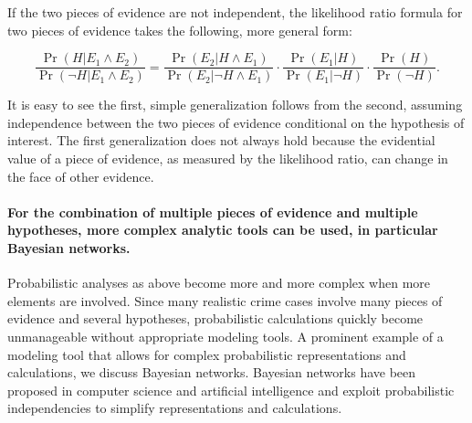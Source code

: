 \documentclass[10pt]{article}
\begin{document}
 If the two pieces of evidence are not independent, 
the likelihood ratio formula for two pieces of evidence 
takes the following, more general 
form:

	\[ \frac{\Pr(H|E_1 \land E_2)}{\Pr(\neg H | E_1 \land E_2)} = 
	\frac{\Pr(E_2 | H \land E_1)}{\Pr(E_2| \neg H \land E_1)}
	\cdot 
	\frac{\Pr(E_1 | H)}{\Pr(E_1| \neg H)}
	\cdot 
	\frac{\Pr(H)}{\Pr(\neg H)}.\]

\noindent It is easy to see the first, simple generalization follows from the second, assuming 
independence between the two pieces of evidence conditional on the hypothesis of interest. 
The first generalization does not always hold because 
the evidential value of a piece of evidence, as measured by the likelihood ratio, 
can change in the face of other evidence. 









\paragraph{For the combination of multiple pieces of evidence and multiple hypotheses, more complex analytic tools can be used, in particular Bayesian networks.} Probabilistic analyses as above become more and more complex when more elements are involved. Since many realistic crime cases involve many pieces of evidence and several hypotheses, probabilistic calculations quickly become unmanageable without appropriate modeling tools. A prominent example of a modeling tool that allows for complex probabilistic representations and calculations, we discuss Bayesian networks. Bayesian networks have been proposed in computer science and artificial intelligence and exploit probabilistic independencies to simplify representations and calculations.
\end{document}

